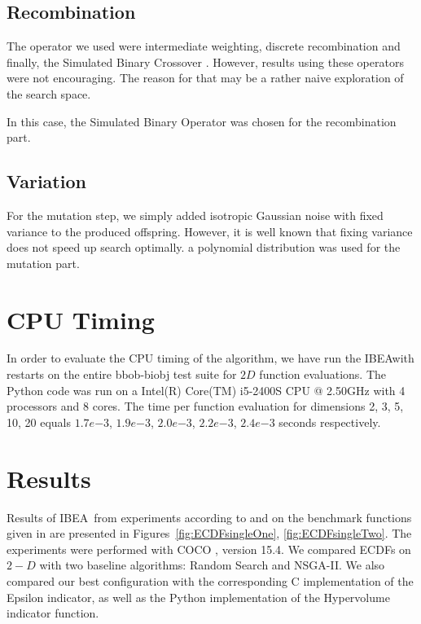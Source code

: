 \documentclass{sig-alternate}
\newcommand{\algname}{IBEA}
\begin{document}
\subsection{Recombination}

The operator we used were intermediate weighting, discrete recombination  and finally, the Simulated Binary Crossover \cite{deb1994simulated}. However, results using these operators were not encouraging. The reason for that may be a rather naive exploration of the search space.

In this case, the Simulated Binary Operator was chosen for the recombination part.
\subsection{Variation}

For the mutation step, we simply added isotropic Gaussian noise with fixed variance to the produced offspring. However, it is well known that fixing variance does not speed up search optimally.
a polynomial distribution was used for the mutation part.  
\section{CPU Timing}
In order to evaluate the CPU timing of the algorithm, we have run the \algname with restarts on the entire bbob-biobj test suite \cite{biobj2016func} for $2 D$ function evaluations. The Python code was run on a Intel(R) Core(TM) i5-2400S CPU @ 2.50GHz with 4 processors and 8 cores. The time per function evaluation for dimensions 2, 3, 5, 10, 20 equals $1.7e{-3}$, $1.9e{-3}$, $2.0e{-3}$, $2.2e{-3}$, $2.4e{-3}$ seconds respectively.  


\section{Results}

Results of \algname\ from experiments according to \cite{hansen2016exp} and \cite{brockhoff2016biobjective} on the benchmark
functions given in \cite{biobj2016func} are presented in
Figures~\ref{fig:ECDFsingleOne}, \ref{fig:ECDFsingleTwo}. The experiments were performed with COCO \cite{hansen2016cocoplat}, version 15.4. We compared ECDFs on $2-D$ with two baseline algorithms: Random Search and NSGA-II. We also compared our best configuration with the corresponding C implementation of the Epsilon indicator, as well as the Python implementation of the Hypervolume indicator function. 
\end{document}
